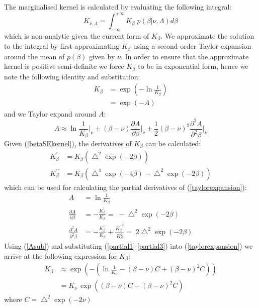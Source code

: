 \documentclass{article}
\begin{document}
The marginalised kernel is calculated by evaluating the following integral:
\begin{equation} \label{kernelmargint}
K_{\nu,\Lambda} = \int_{-\infty}^{+\infty} K_\beta \; p(\beta|\nu,\Lambda) d\beta
\end{equation}
which is non-analytic given the current form of $K_\beta$. We approximate the solution to the integral by first approximating $K_\beta$ using a second-order Taylor expansion around the mean of $p(\beta)$ given by $\nu$. In order to ensure that the approximate kernel is positive semi-definite we force $K_\beta$ to be in exponential form, hence we note the following identity and substitution:
\begin{align}
K_\beta &= \exp \left( -\ln \frac{1}{K_\beta} \right) \nonumber\\ 
&= \exp \left( -A \right) \label{Asub}
\end{align}
and we Taylor expand around $A$:
\begin{equation} \label{taylorexpansion}
A \approx \ln \frac{1}{K_{\beta}}\bigg|_{\nu} + (\beta-\nu) \frac{\partial{A}}{\partial{\beta}}\bigg|_{\nu} + \frac{1}{2}(\beta-\nu)^2 \frac{\partial^2{A}}{\partial^2{\beta}}\bigg|_{\nu}
\end{equation}
Given (\ref{betaSEkernel}), the derivatives of $K_\beta$ can be calculated:
\begin{align*}
K^\prime_\beta &= K_\beta \left( \bigtriangleup^2 \exp(-2\beta)  \right) \\ 
K^{\prime\prime}_\beta &= K_\beta \left( \bigtriangleup^4 \exp(-4\beta) -  \bigtriangleup^2 \exp(-2\beta) \right)
\end{align*}
which can be used for calculating the partial derivatives of (\ref{taylorexpansion}):
\begin{align}
A &= \ln \frac{1}{K_\beta} \label{partial1}\\
\frac{\partial{A}}{\partial{\beta}} &= -\frac{K^\prime_\beta}{K_\beta} = \; -\bigtriangleup^2 \exp(-2\beta) \label{partial2}\\
\frac{\partial^2{A}}{\partial^2{\beta}} &= -\frac{K^{\prime\prime}_\beta}{K_\beta} + \frac{{K^\prime_\beta}^2}{K_\beta^2} = \; 2 \bigtriangleup^2 \exp(-2\beta) \label{partial3}
\end{align}
Using (\ref{Asub}) and substituting (\ref{partial1}-\ref{partial3}) into (\ref{taylorexpansion}) we arrive at the following expression for $K_\beta$:
\begin{align}
K_\beta &\approx \exp \left(-\left( \ln \frac{1}{K_{\nu}} - (\beta-\nu) C + (\beta-\nu)^2 C \right)   \right) \nonumber\\
&= K_{\nu} \, \exp \left( (\beta-\nu) C - (\beta-\nu)^2 C \right) \label{approxkernel}
\end{align}
where $C = \bigtriangleup^2 \exp(-2\nu)$
\end{document}
